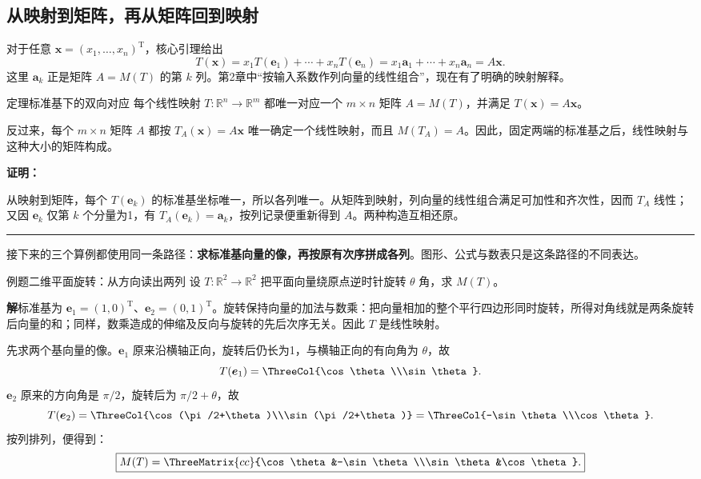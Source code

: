 \documentclass[a4paper,12pt,twoside,openany,fontset=none]{ctexbook}
\newcounter{theorem}[chapter]
\newenvironment{theorem}[1][]{\begin{thmBox}{定理}{#1}}{\end{thmBox}}
\newcounter{example}[chapter]
\newenvironment{example}[1][]{\begin{exBox}{例题}{#1}}{\end{exBox}}
\renewenvironment{proof}{
    \par\vspace{0.5em}\noindent
    \textbf{\color{LogicColor} 证明：}
}{
    \hfill \textcolor{LogicColor}{\rule{0.6em}{0.6em}} \par
}
\numberwithin{equation}{chapter}
\begin{document}
\subsection*{从映射到矩阵，再从矩阵回到映射}

对于任意 $\boldsymbol x=(x_1,\ldots,x_n)^{\mathrm T}$，核心引理给出
\[
 T(\boldsymbol x)=x_1T(\boldsymbol e_1)+\cdots+x_nT(\boldsymbol e_n)
 =x_1\boldsymbol a_1+\cdots+x_n\boldsymbol a_n=A\boldsymbol x.
\]
这里 $\boldsymbol a_k$ 正是矩阵 $A=M(T)$ 的第 $k$ 列。第2章中“按输入系数作列向量的线性组合”，现在有了明确的映射解释。

\begin{theorem}[标准基下的双向对应]
每个线性映射 $T:\mathbb R^n\to\mathbb R^m$ 都唯一对应一个 $m\times n$ 矩阵 $A=M(T)$，并满足 $T(\boldsymbol x)=A\boldsymbol x$。

反过来，每个 $m\times n$ 矩阵 $A$ 都按 $T_A(\boldsymbol x)=A\boldsymbol x$ 唯一确定一个线性映射，而且 $M(T_A)=A$。因此，固定两端的标准基之后，线性映射与这种大小的矩阵构成\textbf{}。
\end{theorem}

\begin{proof}
从映射到矩阵，每个 $T(\boldsymbol e_k)$ 的标准基坐标唯一，所以各列唯一。从矩阵到映射，列向量的线性组合满足可加性和齐次性，因而 $T_A$ 线性；又因 $\boldsymbol e_k$ 仅第 $k$ 个分量为1，有 $T_A(\boldsymbol e_k)=\boldsymbol a_k$，按列记录便重新得到 $A$。两种构造互相还原。
\end{proof}

接下来的三个算例都使用同一条路径：\textbf{求标准基向量的像，再按原有次序拼成各列}。图形、公式与数表只是这条路径的不同表达。

\clearpage
\linespread{1}\fontsize{11.5pt}{18pt}\selectfont
\begin{example}[二维平面旋转：从方向读出两列]
设 $T:\mathbb R^2\to\mathbb R^2$ 把平面向量绕原点逆时针旋转 $\theta$ 角，求 $M(T)$。
\end{example}

\textbf{解}\quad 标准基为 $\boldsymbol e_1=(1,0)^{\mathrm T}$、$\boldsymbol e_2=(0,1)^{\mathrm T}$。旋转保持向量的加法与数乘：把向量相加的整个平行四边形同时旋转，所得对角线就是两条旋转后向量的和；同样，数乘造成的伸缩及反向与旋转的先后次序无关。因此 $T$ 是线性映射。

先求两个基向量的像。$\boldsymbol e_1$ 原来沿横轴正向，旋转后仍长为1，与横轴正向的有向角为 $\theta$，故
\[
    T(\boldsymbol e_1)=\ThreeCol{\cos\theta\\\sin\theta}.
\]
$\boldsymbol e_2$ 原来的方向角是 $\pi/2$，旋转后为 $\pi/2+\theta$，故
\[
    T(\boldsymbol e_2)
    =\ThreeCol{\cos(\pi/2+\theta)\\\sin(\pi/2+\theta)}
    =\ThreeCol{-\sin\theta\\\cos\theta}.
\]
按列排列，便得到\textbf{}：
\[
    \boxed{M(T)=\ThreeMatrix{cc}{\cos\theta&-\sin\theta\\\sin\theta&\cos\theta}.}
\]
\end{document}
